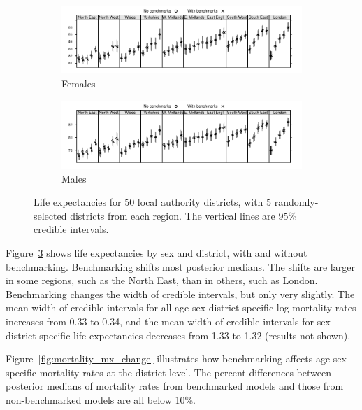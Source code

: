 \documentclass[12pt]{article}
\begin{document}
\begin{figure}
    \begin{subfigure}[b]{\textwidth}
     \center
    \includegraphics{out/mortality/mortality_lx_change_females}
      \caption{\small Females}
        \label{fig:mortality_lx_change_females}
    \end{subfigure}
    \begin{subfigure}[b]{\textwidth}
     \center
    \includegraphics{out/mortality/mortality_lx_change_males}
      \caption{\small Males}
        \label{fig:mortality_lx_change_males}
    \end{subfigure}
  \caption{\small Life expectancies for 50 local authority districts, with 5 randomly-selected districts from each region.  The vertical lines are 95\% credible intervals.}
  \label{fig:mortality_lx_change}
\end{figure}

Figure~\ref{fig:mortality_lx_change} shows life expectancies by sex and district, with and without benchmarking.  Benchmarking shifts most posterior medians.  The shifts are larger in some regions, such as the North East, than in others, such as London.  Benchmarking changes the width of credible intervals, but only very slightly.  The mean width of credible intervals for all age-sex-district-specific log-mortality rates increases from 0.33 to 0.34, and the mean width of credible intervals for sex-district-specific life expectancies decreases from 1.33 to 1.32 (results not shown).

Figure~\ref{fig:mortality_mx_change} illustrates how benchmarking affects age-sex-specific mortality rates at the district level.  The percent differences between posterior medians of mortality rates from benchmarked models and those from non-benchmarked models are all below 10\%.
\end{document}
